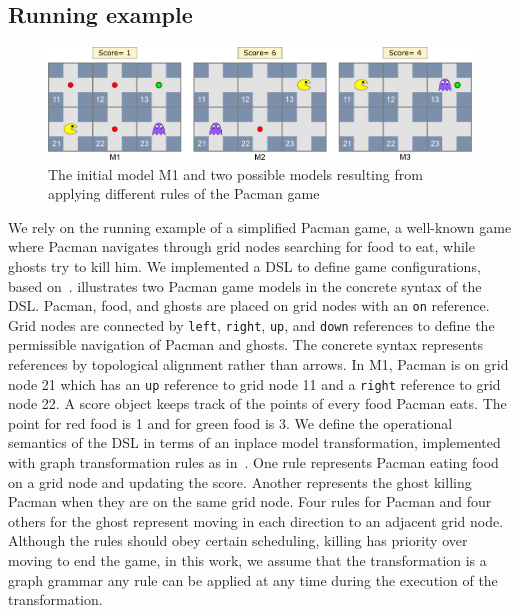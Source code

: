 \subsection{Running example}\label{sec:example}

\begin{figure}
    \centering
    \includegraphics[width=\linewidth]{images/pacman_example}
    \caption{The initial model M1 and two possible models resulting from applying different rules of the Pacman game}
    \label{fig:example}
\end{figure}
%
We rely on the running example of a simplified Pacman game, a well-known game where Pacman navigates through grid nodes searching for food to eat, while ghosts try to kill him.
We implemented a DSL to define game configurations, based on~\cite{Syriani2013a}.
 illustrates two Pacman game models in the concrete syntax of the DSL.
Pacman, food, and ghosts are placed on grid nodes with an \texttt{on} reference.
Grid nodes are connected by \texttt{left}, \texttt{right}, \texttt{up}, and \texttt{down} references to define the permissible navigation of Pacman and ghosts.
The concrete syntax represents references by topological alignment rather than arrows.
In M1, Pacman is on grid node 21 which has an \texttt{up} reference to grid node 11 and a \texttt{right} reference to grid node 22.
A score object keeps track of the points of every food Pacman eats.
The point for red food is 1 and for green food is 3.
We define the operational semantics of the DSL in terms of an inplace model transformation, implemented with graph transformation rules as in~\cite{Syriani2013a}.
One rule represents Pacman eating food on a grid node and updating the score.
Another represents the ghost killing Pacman when they are on the same grid node.
Four rules for Pacman and four others for the ghost represent moving in each direction to an adjacent grid node.
Although the rules should obey certain scheduling, \eg killing has priority over moving to end the game, in this work, we assume that the transformation is a graph grammar \ie any rule can be applied at any time during the execution of the transformation.

